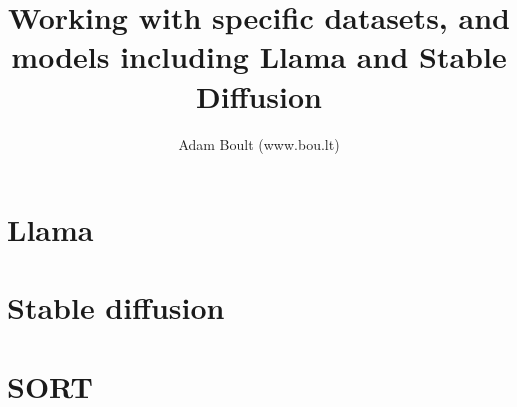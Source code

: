 \documentclass[oneside]{book}
\begin{document}
\author{Adam Boult (www.bou.lt)}
\title{Working with specific datasets, and models including Llama and Stable Diffusion}
\maketitle

\setcounter{tocdepth}{0}
\tableofcontents



\part{Llama}


\part{Stable diffusion}


\part{SORT}

\end{document}
